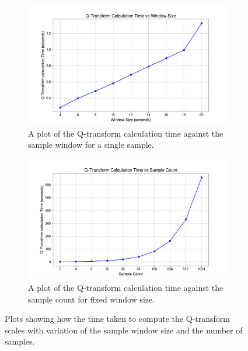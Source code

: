 \documentclass[12pt]{article}
\begin{document}
\begin{figure}[H]
  \centering
  \begin{subfigure}[t]{0.65\textwidth}
    \centering
    \includegraphics[width=\textwidth]{images/q_transform_time_vs_window_size.pdf}
    \caption{A plot of the Q-transform calculation time against the sample window for a single sample.}
    \label{fig:qtransform_vs_windowsize}
  \end{subfigure}
  \hspace{25px}
  \begin{subfigure}[t]{0.65\textwidth}
    \centering
    \includegraphics[width=\textwidth]{images/q_transform_time_vs_sample_count.pdf}
    \caption{A plot of the Q-transform calculation time against the sample count for fixed window size.}
    \label{fig:qtransform_vs_samplecount}
  \end{subfigure}
  \caption{Plots showing how the time taken to compute the Q-transform scales with variation of the sample window size and the number of samples.}
\end{figure}
\end{document}
